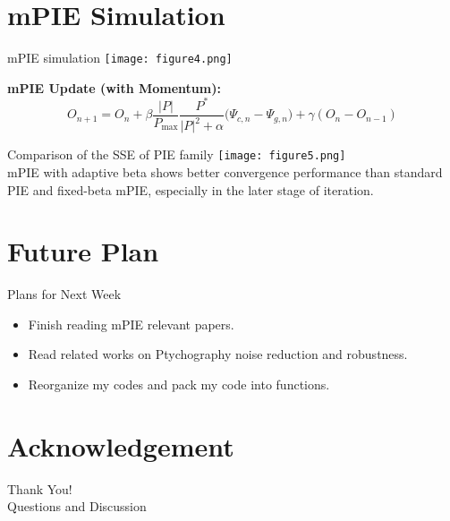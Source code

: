 \documentclass[15pt]{beamer}
\begin{document}
\section{mPIE Simulation}
\begin{frame}{mPIE simulation}
    \centering
    \texttt{[image: figure4.png]}
   
\textbf{mPIE Update (with Momentum):}
\[
O_{n+1} = O_n +
\beta \frac{|P|}{P_{\max}}
\frac{P^{*}}{|P|^2+\alpha}
\big(\Psi_{c,n}-\Psi_{g,n}\big)
+ \gamma (O_n - O_{n-1})
\]
\end{frame}

\begin{frame}{Comparison of the SSE of PIE family}
    \centering
    \texttt{[image: figure5.png]}
   \\ mPIE with adaptive beta shows better convergence performance than standard PIE and fixed-beta mPIE, especially in the later stage of iteration.
\end{frame}

\section{Future Plan}
\begin{frame}{Plans for Next Week}
\footnotesize
\begin{itemize}
  \item [\ding{43}] Finish reading mPIE relevant papers.
  \item [\ding{43}] Read related works on Ptychography noise reduction and robustness.
  \item [\ding{43}] Reorganize my codes and pack my code into functions.
\end{itemize}
\end{frame}

\section*{Acknowledgement}
\begin{frame}[plain]
\centering
\vspace{1cm}
\Huge Thank You!\\[3mm]
\large Questions and Discussion
\end{frame}
\end{document}
